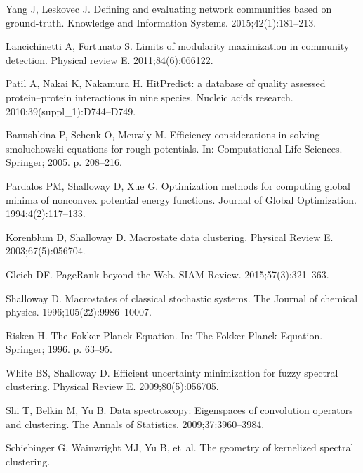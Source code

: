 \documentclass[10pt,letterpaper]{article}
\begin{document}
\begin{thebibliography}{10}
Yang J, Leskovec J.
\newblock Defining and evaluating network communities based on ground-truth.
\newblock Knowledge and Information Systems. 2015;42(1):181--213.

Lancichinetti A, Fortunato S.
\newblock Limits of modularity maximization in community detection.
\newblock Physical review E. 2011;84(6):066122.

Patil A, Nakai K, Nakamura H.
\newblock HitPredict: a database of quality assessed protein--protein
  interactions in nine species.
\newblock Nucleic acids research. 2010;39(suppl\_1):D744--D749.

Banushkina P, Schenk O, Meuwly M.
\newblock Efficiency considerations in solving smoluchowski equations for rough
  potentials.
\newblock In: Computational Life Sciences. Springer; 2005. p. 208--216.

Pardalos PM, Shalloway D, Xue G.
\newblock Optimization methods for computing global minima of nonconvex
  potential energy functions.
\newblock Journal of Global Optimization. 1994;4(2):117--133.

Korenblum D, Shalloway D.
\newblock Macrostate data clustering.
\newblock Physical Review E. 2003;67(5):056704.

Gleich DF.
\newblock PageRank beyond the Web.
\newblock SIAM Review. 2015;57(3):321--363.

Shalloway D.
\newblock Macrostates of classical stochastic systems.
\newblock The Journal of chemical physics. 1996;105(22):9986--10007.

Risken H.
\newblock The Fokker Planck Equation.
\newblock In: The Fokker-Planck Equation. Springer; 1996. p. 63--95.

White BS, Shalloway D.
\newblock Efficient uncertainty minimization for fuzzy spectral clustering.
\newblock Physical Review E. 2009;80(5):056705.

Shi T, Belkin M, Yu B.
\newblock Data spectroscopy: Eigenspaces of convolution operators and
  clustering.
\newblock The Annals of Statistics. 2009;37:3960--3984.

Schiebinger G, Wainwright MJ, Yu B, et~al.
\newblock The geometry of kernelized spectral clustering.

\end{thebibliography}
\end{document}
